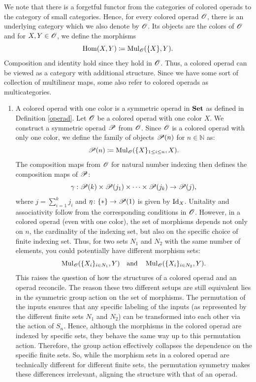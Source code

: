 \begin{rem}
    We note that there is a forgetful functor from the categories of colored
    operads to the category of small categories. Hence, for every colored operad
    $\O$, there is an underlying category which we also denote by $\O$. Its
    objects are the colors of $\O$ and for $X, Y \in \O$, we define the
    morphisms 
    \[
    \Hom(X,Y) \coloneqq \Mul_{\O}(\{X\}, Y).
    \]
    Composition and identity hold since they hold in $\O$. Thus, a colored
    operad can be viewed as a category with additional structure. Since we have
    some sort of collection of multilinear maps, some also refer to colored
    operads as multicategories.
\end{rem}

\begin{egs}
    \begin{enumerate}
        \item A colored operad with one color is a symmetric operad in $\Set$ as
        defined in Definition \ref{operad}. Let $\O$ be a colored operad with
        one color $X$. We construct a symmetric operad $\P$ from $\O$.
        Since $\O$ is a colored operad with only one color, we define the family
        of objects $\P(n)$ for $n \in \mathbb{N}$ as:
        \[
            \P(n) \coloneqq \Mul_{\O}(\{X\}_{1\leq i \leq n}, X).
        \]
        The composition maps from $\O$ for natural number indexing then defines
        the composition maps of $\P$:
        \[
            \gamma: \P(k) \times \P(j_1) \times \cdots \times \P(j_k) \to \P(j),
        \]
        where $j = \sum_{i=1}^k j_i$ and $\eta \colon \{\ast\} \to \P(1)$ is
        given by $\id_X$. Unitality and associativity follow from the
        corresponding conditions in $\O$. However, in a colored operad (even
        with one color), the set of morphisms depends not only on $n$, the
        cardinality of the indexing set, but also on the specific choice of
        finite indexing set. Thus, for two sets $N_1$ and $N_2$ with the same
        number of elements, you could potentially have different morphism sets:
        \[
        \Mul_{\O}(\{X_i\}_{i \in N_1}, Y) \quad \text{and} \quad \Mul_{\O}(\{X_i\}_{i \in N_2}, Y).
        \]
        This raises the question of how the structures of a colored operad and
        an operad reconcile. The reason these two different setups are still
        equivalent lies in the symmetric group action on the set of morphisms.
        The permutation of the inputs ensures that any specific labeling of the
        inputs (as represented by the different finite sets $N_1$ and $N_2$) can
        be transformed into each other via the action of $S_n$. Hence, although
        the morphisms in the colored operad are indexed by specific sets, they
        behave the same way up to this permutation action. Therefore, the group
        action effectively collapses the dependence on the specific finite sets.
        So, while the morphism sets in a colored operad are technically
        different for different finite sets, the permutation symmetry makes
        these differences irrelevant, aligning the structure with that of an
        operad.
    

\end{enumerate}
\end{egs}
